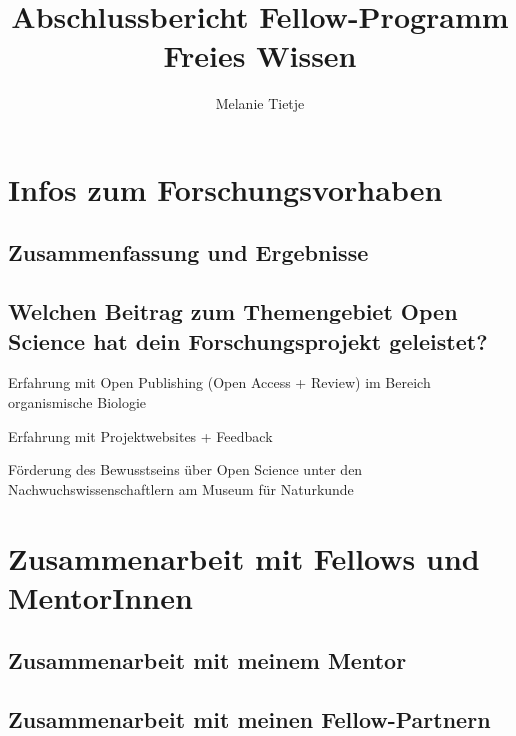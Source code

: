 \documentclass[11pt,a4paper]{article}
\begin{document}
\title{Abschlussbericht Fellow-Programm Freies Wissen}
\author{Melanie Tietje}
\maketitle


\section{Infos zum Forschungsvorhaben}%
\subsection{Zusammenfassung und Ergebnisse} %

\subsection{Welchen Beitrag zum Themengebiet Open Science hat dein Forschungsprojekt geleistet?}%
\begin{compactitem}
\item Erfahrung mit Open Publishing (Open Access + Review) im Bereich organismische Biologie
\item Erfahrung mit Projektwebsites + Feedback
\item Förderung des Bewusstseins über Open Science unter den Nachwuchswissenschaftlern am Museum für Naturkunde
\end{compactitem}



\section{Zusammenarbeit mit Fellows und MentorInnen}%
\subsection{Zusammenarbeit mit meinem Mentor}%


\subsection{Zusammenarbeit mit meinen Fellow-Partnern}%
\end{document}
